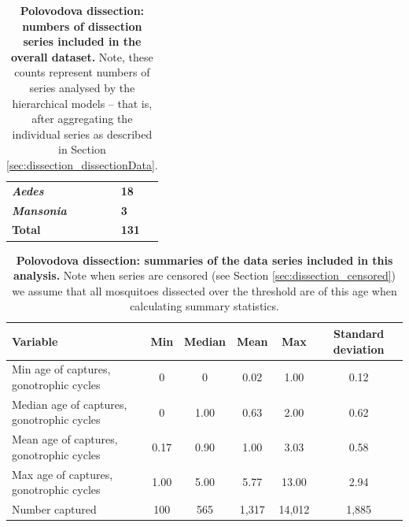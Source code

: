 \documentclass[12pt]{article}
\begin{document}
{\begin{table}[htbp]
\begin{tabular}{lll}
		\textit{\textbf{Aedes}} &       & \textbf{18} \\
		\textit{\textbf{Mansonia}} &       & \textbf{3} \\
		\bottomrule
		\textbf{Total} &  & \textbf{131} \\
	\end{tabular}%
	\caption{\textbf{Polovodova dissection: numbers of dissection series included in the overall dataset.} Note, these counts represent numbers of series analysed by the hierarchical models -- that is, after aggregating the individual series as described in Section \ref{sec:dissection_dissectionData}.}\label{tab:dissection_speciesNumbers}%
\end{table}%


\begin{table}[htbp]
	\centering
	\footnotesize
	\begin{adjustwidth}{-0.3in}{-0.3in}%
		\begin{tabularx}{1.1\textwidth}{l|ccccc}
			\toprule
			\textbf{Variable} & \textbf{Min} & \textbf{Median} & \textbf{Mean} & \textbf{Max} & \textbf{Standard deviation} \\
			\midrule
			Min age of captures, gonotrophic cycles & 0  & 0  & 0.02  & 1.00  & 0.12 \\
			Median age of captures, gonotrophic cycles & 0  & 1.00  & 0.63  & 2.00  & 0.62 \\
			Mean age of captures, gonotrophic cycles & 0.17  & 0.90  & 1.00  & 3.03  & 0.58 \\
			Max age of captures, gonotrophic cycles & 1.00  & 5.00  & 5.77  & 13.00 & 2.94 \\
			Number captured & 100 & 565 & 1,317 & 14,012 & 1,885 \\
			\bottomrule
		\end{tabularx}%
	\end{adjustwidth}
	\caption{\textbf{Polovodova dissection: summaries of the data series included in this analysis.} Note when series are censored (see Section \ref{sec:dissection_censored}) we assume that all mosquitoes dissected over the threshold are of this age when calculating summary statistics.}\label{tab:dissection_summaryStats}
\end{table}

}
\end{document}
